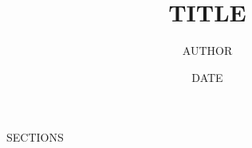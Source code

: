 \documentclass{CLASS}
\title{TITLE}
\author{AUTHOR}
\date{DATE}
\begin{document}
\maketitle

SECTIONS


%


%
\end{document}
